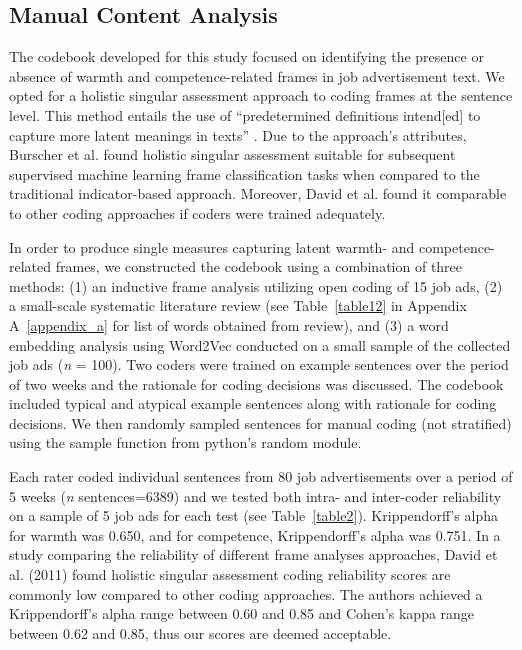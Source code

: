 \documentclass[Royal,sageapa,times]{sagej}
\begin{document}
\subsection{Manual Content Analysis\label{manual_content_analysis}}
The codebook developed for this study focused on identifying the presence or absence of warmth and competence-related frames in job advertisement text. We opted for a holistic singular assessment approach to coding frames at the sentence level. This method entails the use of “predetermined definitions intend[ed] to capture more latent meanings in texts” . Due to the approach’s attributes, Burscher et al.  found holistic singular assessment suitable for subsequent supervised machine learning frame classification tasks when compared to the traditional indicator-based approach. Moreover, David et al.  found it comparable to other coding approaches if coders were trained adequately.

In order to produce single measures capturing latent warmth- and competence-related frames, we constructed the codebook using a combination of three methods: (1) an inductive frame analysis utilizing open coding of 15 job ads, (2) a small-scale systematic literature review (see Table~\ref{table12} in Appendix A~\ref{appendix_a} for list of words obtained from review), and (3) a word embedding analysis using Word2Vec conducted on a small sample of the collected job ads (\textit{n} = 100). Two coders were trained on example sentences over the period of two weeks and the rationale for coding decisions was discussed. The codebook included typical and atypical example sentences along with rationale for coding decisions. We then randomly sampled sentences for manual coding (not stratified) using the sample function from python’s random module.

Each rater coded individual sentences from 80 job advertisements over a period of 5 weeks (\textit{n} sentences=6389) and we tested both intra- and inter-coder reliability on a sample of 5 job ads for each test (see Table~\ref{table2}). Krippendorff’s alpha for warmth was 0.650, and for competence, Krippendorff’s alpha was 0.751. In a study comparing the reliability of different frame analyses approaches, David et al. (2011) found holistic singular assessment coding reliability scores are commonly low compared to other coding approaches. The authors achieved a Krippendorff’s alpha range between 0.60 and 0.85 and Cohen’s kappa range between 0.62 and 0.85, thus our scores are deemed acceptable.
\end{document}
